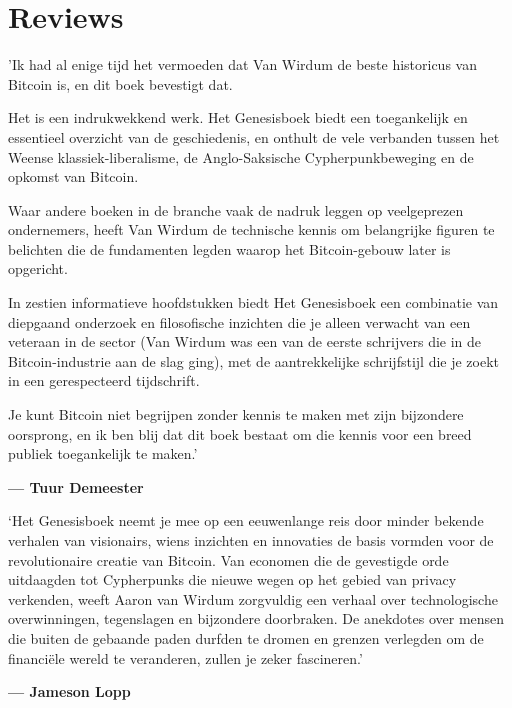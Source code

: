 \documentclass[
  a5paper,
  smalldemyvopaper,11pt,twoside,onecolumn,openright,extrafontsizes,
hidelinks]{memoir}
\renewenvironment{quote}%
               {\list{}{\rightmargin=.3cm\leftmargin=.3cm}%
                \itshape \item[]}%
               {\endlist}
\begin{document}

\chapter*{Reviews}\label{reviews}


\begin{quote}
'Ik had al enige tijd het vermoeden dat Van Wirdum de beste historicus
van Bitcoin is, en dit boek bevestigt dat.

Het is een indrukwekkend werk. Het Genesisboek biedt een toegankelijk en
essentieel overzicht van de geschiedenis, en onthult de vele verbanden
tussen het Weense klassiek-liberalisme, de Anglo-Saksische
Cypherpunkbeweging en de opkomst van Bitcoin.

Waar andere boeken in de branche vaak de nadruk leggen op veelgeprezen
ondernemers, heeft Van Wirdum de technische kennis om belangrijke
figuren te belichten die de fundamenten legden waarop het Bitcoin-gebouw
later is opgericht.

In zestien informatieve hoofdstukken biedt Het Genesisboek een
combinatie van diepgaand onderzoek en filosofische inzichten die je
alleen verwacht van een veteraan in de sector (Van Wirdum was een van de
eerste schrijvers die in de Bitcoin-industrie aan de slag ging), met de
aantrekkelijke schrijfstijl die je zoekt in een gerespecteerd
tijdschrift.

Je kunt Bitcoin niet begrijpen zonder kennis te maken met zijn
bijzondere oorsprong, en ik ben blij dat dit boek bestaat om die kennis
voor een breed publiek toegankelijk te maken.'

\textbf{--- Tuur Demeester}
\end{quote}

\begin{quote}
`Het Genesisboek neemt je mee op een eeuwenlange reis door minder
bekende verhalen van visionairs, wiens inzichten en innovaties de basis
vormden voor de revolutionaire creatie van Bitcoin. Van economen die de
gevestigde orde uitdaagden tot Cypherpunks die nieuwe wegen op het
gebied van privacy verkenden, weeft Aaron van Wirdum zorgvuldig een
verhaal over technologische overwinningen, tegenslagen en bijzondere
doorbraken. De anekdotes over mensen die buiten de gebaande paden
durfden te dromen en grenzen verlegden om de financiële wereld te
veranderen, zullen je zeker fascineren.'

\textbf{--- Jameson Lopp}
\end{quote}
\end{document}
